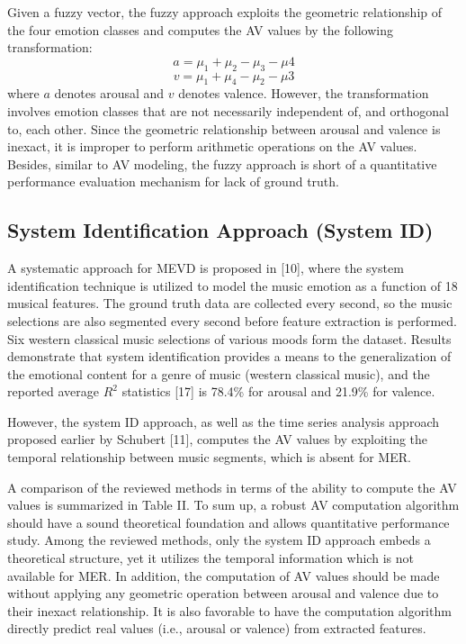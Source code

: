 \documentclass[journal, twoside]{IEEEtran}
\begin{document}
Given a fuzzy vector, the fuzzy approach exploits the geometric relationship of the four emotion classes and computes the AV values by the following transformation:
\begin{equation}
    a = \mu_1+\mu_2-\mu_3-\mu4
\end{equation}
\begin{equation}
    v = \mu_1+\mu_4-\mu_2-\mu3
\end{equation}
where $a$ denotes arousal and $v$ denotes valence. However, the transformation involves emotion classes that are not necessarily independent of, and orthogonal to, each other. Since the geometric relationship between arousal and valence is inexact, it is improper to perform arithmetic operations on the AV values. Besides, similar to AV modeling, the fuzzy approach is short of a quantitative performance evaluation mechanism for lack of ground truth.
\vspace{-1em}
\subsection{System Identification Approach (System ID)}
A systematic approach for MEVD is proposed in [10],
where the system identification technique is utilized to model
the music emotion as a function of 18 musical features. The
ground truth data are collected every second, so the music
selections are also segmented every second before feature
extraction is performed. Six western classical music selections
of various moods form the dataset. Results demonstrate that
system identification provides a means to the generalization of
the emotional content for a genre of music (western classical music), and the reported average $R^2$ statistics [17] is 78.4\% for arousal and 21.9\% for valence.

However, the system ID approach, as well as the time series
analysis approach proposed earlier by Schubert [11], computes
the AV values by exploiting the temporal relationship between
music segments, which is absent for MER.

A comparison of the reviewed methods in terms of the ability
to compute the AV values is summarized in Table II. To sum up,
a robust AV computation algorithm should have a sound theoretical foundation and allows quantitative performance study.
Among the reviewed methods, only the system ID approach embeds a theoretical structure, yet it utilizes the temporal information which is not available for MER. In addition, the computation of AV values should be made without applying any geometric operation between arousal and valence due to their inexact relationship. It is also favorable to have the computation algorithm directly predict real values (i.e., arousal or valence)
from extracted features.
\end{document}
